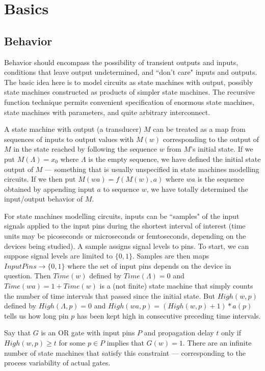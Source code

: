 \documentclass[runningheads,letter]{llncs}
\newcommand{\set}[1]{\{#1\}}
\newcommand{\ess}{\Lambda}
\begin{document}
\section{Basics \label{sec:example1}}
\subsection{Behavior}
Behavior should encompass
the possibility of transient outputs and inputs, conditions that leave
output undetermined, and ``don't care" inputs and outputs.
The basic idea here is to model circuits as state
machines with output, possibly state machines constructed as products of
simpler state machines. The recursive function technique permits convenient specification of
enormous state machines, state machines with parameters, and quite arbitrary
interconnect. 

A state machine with output (a transducer) $M$ can be treated as a map from sequences
of inputs to output values with $M(w)$ corresponding to the output of $M$
in the state reached by following the sequence $w$ from $M$'s initial state. If we put $M(\ess)=x_0$ where $\ess$ is the empty sequence, we have defined
the initial state output of $M$ --- something that is usually unspecified
in state machines modelling circuits. If we then put $M(wa)= f(M(w),a)$ where
$wa$ is the sequence obtained by appending input $a$ to sequence $w$, we have
totally determined the input/output behavior of $M$.

For state machines
modelling circuits, inputs can be ``samples" of the input signals applied to
the input pins during the shortest interval of interest (time units may be
picoseconds or microseconds or femtoseconds, depending on the devices being
studied). A sample assigns signal levels to pins. To
start, we can suppose signal levels are limited to $\set{0,1}$. Samples are then
maps $InputPins\to \set{0,1}$ where the set of input pins depends on the device
in question.  Then $Time(w)$ defined by $Time(\ess)=0$ and
$Time(wa)=1+Time(w)$ is a (not finite) state machine that simply counts the
number of time intervals that passed since the initial state. But $High(w,p)$
defined by $High(\ess,p)=0$ and $High(wa,p) = (High(w,p)+1)* a(p)$ tells us how
long pin $p$ has been kept high in consecutive preceding time intervals.

 Say that
$G$ is an OR gate with input pins $P$ and propagation delay $t$ only if 
$High(w,p)\geq t$ for some $p\in P$ implies that $G(w)=1$.  
There are an infinite number of state machines that satisfy this constraint --- corresponding
to the process variability of actual gates.
\end{document}
